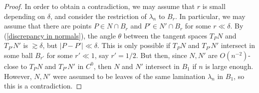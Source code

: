 \documentclass[final,12pt, leqno]{brownthesis}
\theoremstyle{definition}
\numberwithin{equation}{section}
\begin{document}
\begin{proof}
	In order to obtain a contradiction, we may assume that $r$ is small depending on $\delta$, and consider the restriction of $\lambda_n$ to $B_r$.
	In particular, we may assume that there are points $P \in N \cap B_r$ and $P' \in N' \cap B_r$ for some $r \ll \delta$.
	By (\ref{discrepancy in normals}), the angle $\theta$ between the tangent spaces $T_P N$ and $T_{P'} N'$ is $\gtrsim \delta$, but $|P - P'| \ll \delta$.
	This is only possible if $T_P N$ and $T_{P'} N'$ intersect in some ball $B_{r'}$ for some $r' \ll 1$, say $r' = 1/2$.
	But then, since $N, N'$ are $O(n^{-2})$-close to $T_P N$ and $T_{P'} N'$ in $C^0$, then $N$ and $N'$ intersect in $B_1$ if $n$ is large enough.
	However, $N, N'$ were assumed to be leaves of the same lamination $\lambda_n$ in $B_1$, so this is a contradiction.
\end{proof}
\end{document}
